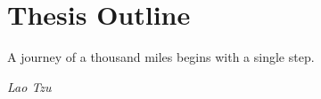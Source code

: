 
\chapter{\label{chp:outline}Thesis Outline}
\vspace{-2 cm}
\epigraph{A journey of a thousand miles begins with a single step.}{\textit{Lao Tzu}}






